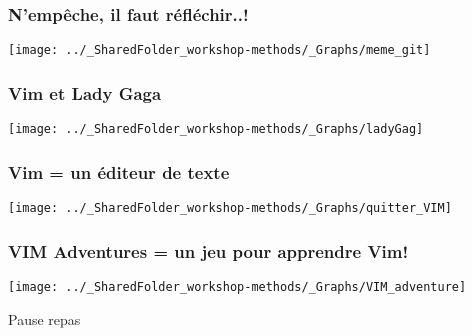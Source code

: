 \documentclass{beamer}
\begin{document}

	      \begin{frame}
	        \frametitle{N'empêche, il faut réfléchir..!} \vspace{1cm}   
	        \begin{center}
	           \texttt{[image: ../\_SharedFolder\_workshop-methods/\_Graphs/meme\_git]}
	        \end{center}  
	    \end{frame}
	    

	      \begin{frame}
	        \frametitle{Vim et Lady Gaga} \vspace{1cm}   
	        \begin{center}
	           \texttt{[image: ../\_SharedFolder\_workshop-methods/\_Graphs/ladyGag]}
	        \end{center}  
	    \end{frame}
	    

	      \begin{frame}
	        \frametitle{Vim = un éditeur de texte} \vspace{1cm}   
	        \begin{center}
	           \texttt{[image: ../\_SharedFolder\_workshop-methods/\_Graphs/quitter\_VIM]}
	        \end{center}  
	    \end{frame}
	    

	          \begin{frame}
	        \frametitle{VIM Adventures = un jeu pour apprendre Vim!} \vspace{1cm}   
	        \begin{center}
	           \texttt{[image: ../\_SharedFolder\_workshop-methods/\_Graphs/VIM\_adventure]}
	        \end{center}  
	    \end{frame}

\begin{frame}
\begin{recipe}
\begin{center}
\Huge Pause repas
\end{center}
\end{recipe}
\end{frame}
\end{document}
